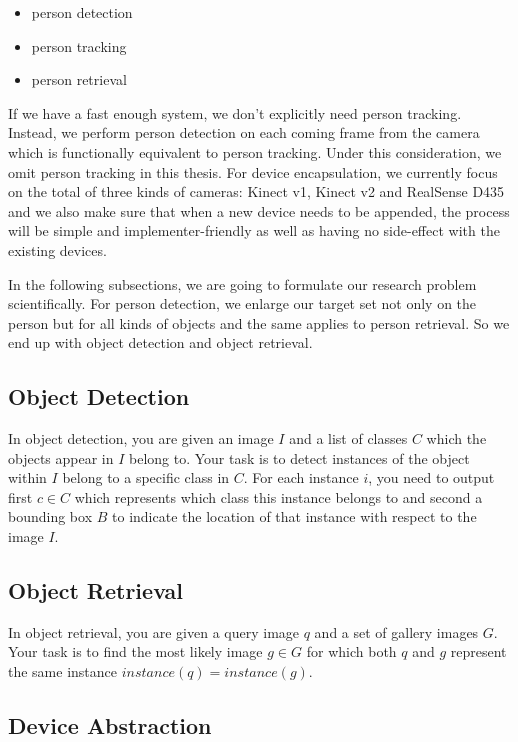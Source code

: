 \begin{itemize}
    \item person detection
    \item person tracking
    \item person retrieval
\end{itemize}

If we have a fast enough system, we don't explicitly need person tracking.
Instead, we perform person detection on each coming frame from the camera which
is functionally equivalent to person tracking. Under this consideration, we
omit person tracking in this thesis.
For device encapsulation, we  currently focus on the total of three kinds of
cameras: Kinect v1, Kinect v2 and RealSense D435 and we also make sure that when
a new device needs to be appended, the process will be simple and
implementer-friendly as well as having no side-effect with the existing devices.

In the following subsections, we are going to formulate our
research problem scientifically. For person detection, we enlarge our target
set not only on the person but for all kinds of objects and the same applies to
person retrieval. So we end up with object detection and object retrieval.

\subsection{Object Detection}

In object detection, you are given an image $I$ and a list of classes $C$ which
the objects appear in $I$ belong to. Your task is to detect instances of the 
object within $I$ belong to a specific class in $C$.
For each instance $i$, you need to output first $c \in C$ which represents 
which class this instance belongs to and second a bounding box $B$ to indicate 
the location of that instance with respect to the image $I$.

\subsection{Object Retrieval}

In object retrieval, you are given a query image $q$ and a set of gallery images
$G$. Your task is to find the
most likely image $g \in G$ for which both $q$ and $g$ represent the same 
instance $instance(q) = instance(g)$.

\subsection{Device Abstraction}

